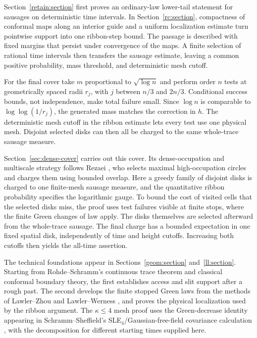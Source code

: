 \documentclass[11pt]{article}
\theoremstyle{definition}
\theoremstyle{remark}
\numberwithin{equation}{section}
\begin{document}
Section~\ref{retain:section} first proves an ordinary-law lower-tail
statement for sausages on deterministic time intervals. In
Section~\ref{rc:section}, compactness of conformal maps along an interior
guide and a uniform localization estimate turn pointwise support into
one ribbon-step bound. The passage is described with fixed margins that
persist under convergence of the maps. A finite selection of rational
time intervals then transfers the sausage estimate, leaving a common
positive probability, mass threshold, and deterministic mesh cutoff.

For the final cover take $m$ proportional to $\sqrt{\log n}$ and
perform order $n$ tests at geometrically spaced radii $r_j$, with $j$ between
$n/3$ and $2n/3$. Conditional success bounds, not independence, make
total failure small. Since $\log n$ is comparable to
$\log\log(1/r_j)$, the generated mass matches the correction in
$h$. The deterministic mesh cutoff in the ribbon estimate lets
every test use one physical mesh. Disjoint selected disks can then
all be charged to the same whole-trace sausage measure.

Section~\ref{sec:dense-cover} carries out this cover. Its dense-occupation
and multiscale strategy follows Rezaei \cite[Section~3, especially
equations~(9)--(11)]{rezaei2018}, who selects maximal high-occupation
circles and charges them using bounded overlap. Here a greedy family
of disjoint disks is charged to one finite-mesh sausage measure, and
the quantitative ribbon probability specifies the logarithmic gauge.
To bound the cost of visited cells that the selected disks miss, the
proof uses test failures visible at finite stops, where the finite Green
changes of law apply. The disks themselves are selected afterward from
the whole-trace sausage. The final charge has a bounded expectation in
one fixed spatial disk, independently of time and height cutoffs.
Increasing both cutoffs then yields the all-time assertion.

The technical foundations appear in Sections~\ref{geom:section}
and~\ref{ll:section}. Starting from Rohde--Schramm's continuous trace
theorem \cite[Theorem~5.1]{rohdeschramm2005} and classical conformal
boundary theory, the first establishes access and slit support after a
rough past. The second develops the finite stopped Green laws from
the methods of Lawler--Zhou \cite[Section~2]{lawlerzhou2013} and
Lawler--Werness \cite[Sections~2.3--2.4]{lawlerwerness2013},
and proves the physical localization used by the ribbon argument.
The $\kappa\le4$ mesh proof uses the Green-decrease identity appearing in
Schramm--Sheffield's SLE$_4$/Gaussian-free-field covariance calculation
\cite[Lemmas~2.5--2.6]{schrammsheffield2013}, with the decomposition for
different starting times supplied here.
\end{document}
